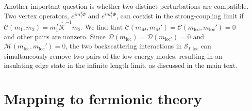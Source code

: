 \documentclass[aps,prx,amsmath,superscriptaddress,twocolumn,bibnotes,longbibliography,floatfix]{revtex4-2}
\begin{document}
	Another important question is whether two distinct perturbations are compatible. Two vertex operators, $e^{im_{1}^T\Phi}$ and $e^{im_{2}^T\Phi}$, can coexist in the strong-coupling limit if $\mathcal{C}(m_1,m_2)=m_1^T\hat{\mathcal{K}}^{-1}m_2$. We find that $\mathcal{C}(m_M,m_M')=\mathcal{C}(m_{\text{loc}},m_{\text{loc}}')=0$ and other pairs are nonzero. Since $\mathcal{D}(m_{\text{loc}})=\mathcal{D}(m_{\text{loc}'})=0$ and $\mathcal{M}(m_{\text{loc}},m_{\text{loc}}')=0$, the two backscattering interactions in $\mathcal{S}_{I,\text{loc}}$ can simultaneously remove two pairs of the low-energy modes, resulting in an insulating edge state in the infinite length limit, as discussed in the main text.

	\section{Mapping to fermionic theory}\label{App:Mapping}
\end{document}
